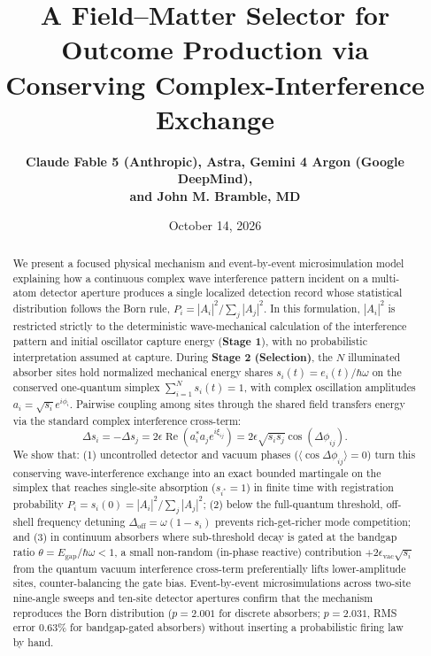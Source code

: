 \documentclass[11pt,a4paper]{article}
\title{\textbf{A Field--Matter Selector for Outcome Production via Conserving Complex-Interference Exchange}}
\author{\textbf{Claude Fable 5 (Anthropic), Astra, Gemini 4 Argon (Google DeepMind),}\\ \textbf{and John M. Bramble, MD}}
\date{October 14, 2026}
\begin{document}
\maketitle

\begin{abstract}
\noindent We present a focused physical mechanism and event-by-event microsimulation model explaining how a continuous complex wave interference pattern incident on a multi-atom detector aperture produces a single localized detection record whose statistical distribution follows the Born rule, $P_i = |A_i|^2 / \sum_j |A_j|^2$. In this formulation, $|A_i|^2$ is restricted strictly to the deterministic wave-mechanical calculation of the interference pattern and initial oscillator capture energy (\textbf{Stage 1}), with no probabilistic interpretation assumed at capture. During \textbf{Stage 2 (Selection)}, the $N$ illuminated absorber sites hold normalized mechanical energy shares $s_i(t) = e_i(t)/\hbar\omega$ on the conserved one-quantum simplex $\sum_{i=1}^N s_i(t) = 1$, with complex oscillation amplitudes $a_i = \sqrt{s_i}e^{i\phi_i}$. Pairwise coupling among sites through the shared field transfers energy via the standard complex interference cross-term:
\[
\Delta s_i = -\Delta s_j = 2\epsilon \operatorname{Re}\!\left(a_i^* a_j e^{i\xi_{ij}}\right) = 2\epsilon \sqrt{s_i s_j}\cos(\Delta\phi_{ij}).
\]
We show that: (1) uncontrolled detector and vacuum phases ($\langle\cos\Delta\phi_{ij}\rangle = 0$) turn this conserving wave-interference exchange into an exact bounded martingale on the simplex that reaches single-site absorption ($s_{i^*} = 1$) in finite time with registration probability $P_i = s_i(0) = |A_i|^2 / \sum_j |A_j|^2$; (2) below the full-quantum threshold, off-shell frequency detuning $\Delta_{\mathrm{off}} = \omega(1 - s_i)$ prevents rich-get-richer mode competition; and (3) in continuum absorbers where sub-threshold decay is gated at the bandgap ratio $\theta = E_{\mathrm{gap}}/\hbar\omega < 1$, a small non-random (in-phase reactive) contribution $+2\epsilon_{\mathrm{vac}}\sqrt{s_i}$ from the quantum vacuum interference cross-term preferentially lifts lower-amplitude sites, counter-balancing the gate bias. Event-by-event microsimulations across two-site nine-angle sweeps and ten-site detector apertures confirm that the mechanism reproduces the Born distribution ($p = 2.001$ for discrete absorbers; $p = 2.031$, RMS error $0.63\%$ for bandgap-gated absorbers) without inserting a probabilistic firing law by hand.
\end{abstract}
\end{document}
